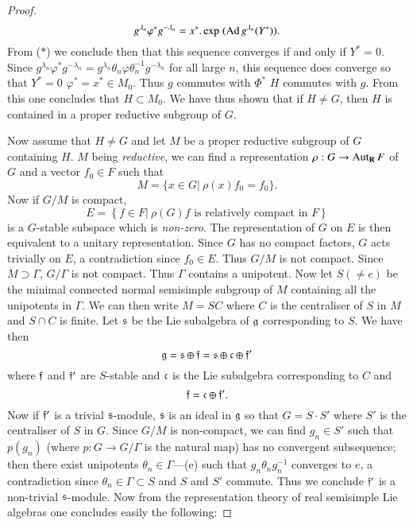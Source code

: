 \begin{proof}
$$
g^{\lambda_n} \varphi^\ast g^{-\lambda_n} = x^\ast. \exp \; (\operatorname{Ad} g^{\lambda_n} (Y^\ast)).
$$
From ($\ast$) we conclude then that this sequence converges if and only if $Y^\ast =0$. Since $g^{\lambda_n} \varphi^\ast g^{-\lambda_n} = g^{\lambda_n} \theta_n \varphi \theta^{-1}_n g^{-\lambda_n}$ for all large $n$, this sequence does converge so that $Y^\ast = 0$ \ie $\varphi^{\ast} = x^\ast \in M_0$. Thus $g$ commutes with $\Phi^\ast$ \ie $H$ commutes with $g$. From this one concludes that $H \subset M_0$. We have thus shown that if $H \neq G$, then $H$ is contained in a proper reductive subgroup of $G$.

Now assume that $H \neq G$ and let $M$ be a proper reductive subgroup of $G$ containing $H$. $M$ being \textit{reductive}, we can find a representation $\rho : G \to \operatorname{Aut}_{\mathbf{R}} F$ of $G$ and a vector $f_0 \in F$ such that 
$$
M = \{x \in G \big|~ \rho (x) f_0 = f_0 \}.
$$\pageoriginale
Now if $G/M$ is compact,
$$
E = \left\{f \in F \big|~\rho (G) f \text{ is relatively compact in } F \right\}
$$
is a $G$-stable subspace which is \textit{non-zero}. The representation of $G$ on $E$ is then equivalent to a unitary representation. Since $G$ has no compact factors, $G$ acts trivially on $E$, a contradiction since $f_0 \in E$. Thus $G/M$ is not compact. Since $M \supset \Gamma$, $G / \Gamma$ is not compact. Thus $\Gamma$ contains a unipotent. Now let $S (\neq e)$ be the minimal connected normal semisimple subgroup of $M$ containing all the unipotents in $\Gamma$. We can then write $M = S C$ where $C$ is the centraliser of $S$ in $M$ and $S \cap C$ is finite. Let $\mathfrak{s}$ be the Lie subalgebra of $\mathfrak{g}$ corresponding to $S$. We have then 
$$
\mathfrak{g} = \mathfrak{s} \oplus \mathfrak{f} = \mathfrak{s} \oplus \mathfrak{c} \oplus \mathfrak{f}'
$$
where $\mathfrak{f}$ and $\mathfrak{f}'$ are $S$-stable and $\mathfrak{c}$ is the Lie subalgebra corresponding to $C$ and
$$
\mathfrak{f} = \mathfrak{c} \oplus \mathfrak{f}'.
$$
Now if $\mathfrak{f}'$ is a trivial $\mathfrak{s}$-module, $\mathfrak{s}$ is an ideal in $\mathfrak{g}$ so that $G = S \cdot S'$ where $S'$ is the centraliser of $S$ in $G$. Since $G/ M$ is non-compact, we can find $g_n \in S'$ such that $p (g_n)$ (where $p: G \to G/\Gamma$ is the natural map) has no convergent subsequence; then there exist unipotents $\theta_n \in \Gamma$---(e) such that $g_n \theta_n g^{-1}_n$ converges to $e$, a contradiction since $\theta_n \in \Gamma \subset S$ and $S$ and $S'$ commute. Thus we conclude $\mathfrak{f}'$ is a non-trivial $\mathfrak{s}$-module. Now from the representation theory of real semisimple Lie algebras one concludes easily the following:


\end{proof}
